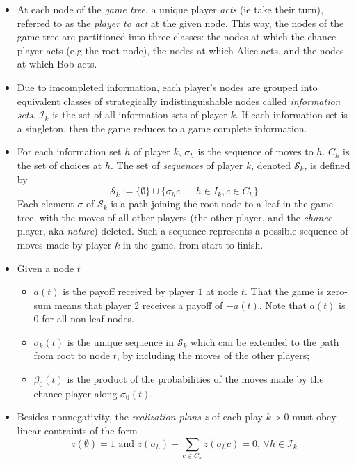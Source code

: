 \documentclass{article} %
\begin{document}
\begin{itemize}
\item At each node of the \textit{game tree}, a unique player \textit{acts} (ie take their turn), referred to as the \textit{player to act} at the given node. This way, the nodes of the game tree are partitioned into three classes: the nodes at which the chance player acts (e.g the root node), the nodes at which Alice acts, and the nodes at which Bob acts.
\item Due to imcompleted information, each player's nodes are grouped into equivalent classes of strategically indistinguishable nodes called \textit{information sets}. $\mathcal{I}_k$ is the set of all information sets of player $k$. If each information set is a singleton, then the game reduces to a game complete information.
\item For each information set $h$ of player $k$, $\sigma_h$ is the sequence of moves to $h$. $C_h$ is the set of choices at $h$. The set of \textit{sequences} of player $k$, denoted $\mathcal{S}_k$, is defined by 
\begin{equation}
\mathcal{S}_k := \{\emptyset\} \cup \{\sigma_h c\text{ } |\text{ } h \in I_k, c \in C_h\}
\end{equation}
Each element $\sigma$ of $\mathcal{S}_k$ is a path joining the root node to a leaf in the game tree, with the moves of all other players (the other player, and the \textit{chance} player, aka \textit{nature}) deleted. Such a sequence represents a possible sequence of moves made by player $k$ in the game, from start to finish.
\item Given a node $t$
  \begin{itemize}
  \item $a(t)$ is the payoff received by player $1$ at node $t$. That the game is zero-sum means that player 2 receives a payoff of $-a(t)$. Note that $a(t)$ is $0$ for all non-leaf nodes.
  \item $\sigma_k(t)$ is the unique sequence in $\mathcal{S}_k$ which can be extended to the path from root to node $t$, by including the moves of the other players;
  \item $\beta_0(t)$ is the product of the probabilities of the moves made by the chance player along $\sigma_0(t)$.
  \end{itemize}

\item Besides nonnegativity, the \textit{realization plans} $z$ of each play $k>0$ must obey linear contraints of the form
\begin{equation}
    z(\emptyset) = 1 \text{ and }
    z(\sigma_h) - \sum_{c \in C_h}{z(\sigma_h c)} = 0\text{, } \forall h \in \mathcal{I}_k
  \label{eq:lin}
\end{equation}


\end{itemize}
\end{document}
